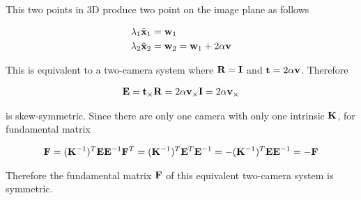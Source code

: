\documentclass[11pt]{article}
\begin{document}
This two points in 3D produce two point on the image plane as follows

\begin{align}
  \lambda_1\tilde{\mathbf{x}}_1 &= \mathbf{w}_1 \\
  \lambda_2\tilde{\mathbf{x}}_2 &= \mathbf{w}_2 = \mathbf{w}_1 + 2\alpha\mathbf{v}
\end{align}

This is equivalent to a two-camera system where $\mathbf{R}=\mathbf{I}$ and $\mathbf{t}=2\alpha\mathbf{v}$. Therefore

\begin{align}
  \mathbf{E} = \mathbf{t}_\times \mathbf{R} = 2\alpha\mathbf{v}_\times \mathbf{I}=2\alpha\mathbf{v}_\times
\end{align}

is skew-symmetric. Since there are only one camera with only one intrinsic $\mathbf{K}$, for fundamental matrix

\begin{align}
  \mathbf{F} = (\mathbf{K}^{-1})^T \mathbf{E} \mathbf{E}^{-1}
  \mathbf{F}^T = (\mathbf{K}^{-1})^T \mathbf{E}^T \mathbf{E}^{-1} = -(\mathbf{K}^{-1})^T \mathbf{E} \mathbf{E}^{-1} = -\mathbf{F}
\end{align}

Therefore the fundamental matrix $\mathbf{F}$ of this equivalent two-camera system is symmetric.

\newpage
\end{document}
